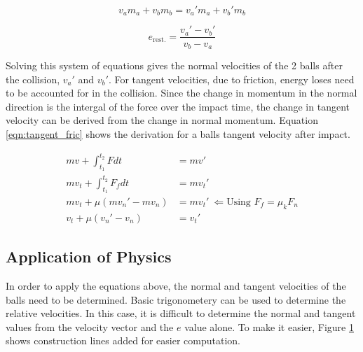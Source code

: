 \documentclass[12pt]{article}
\begin{document}
\begin{equation}
    \label{eqn:pt1_momentum}
    v_a m_a + v_b m_b = v_a' m_a + v_b' m_b
\end{equation}

\begin{equation}
    \label{eqn:pt1_restitution}
    e_{\text{rest.}} = \frac{v_a' - v_b'}{v_b - v_a}
\end{equation}

Solving this system of equations gives the normal velocities of the 2 balls after the collision, $v_a'$ and $v_b'$. For tangent velocities, due to friction, energy loses need to be accounted for in the collision. Since the change in momentum in the normal direction is the intergal of the force over the impact time, the change in tangent velocity can be derived from the change in normal momentum. Equation \ref{eqn:tangent_fric} shows the derivation for a balls tangent velocity after impact.

\begin{equation}
    \label{eqn:tangent_fric}
    \begin{aligned}
        mv + \int_{t_1}^{t_2} Fdt &= mv' \\
        mv_t + \int_{t_1}^{t_2} F_f dt &= mv_t' \\
        mv_t + \mu\left(mv_n' - mv_n\right) &= mv_t' \ \Leftarrow \text{Using $F_f = \mu_k F_n$}\\
        v_t + \mu\left(v_n' - v_n\right) &= v_t'
    \end{aligned}
\end{equation}

\subsection{Application of Physics}
In order to apply the equations above, the normal and tangent velocities of the balls need to be determined. Basic trigonometery can be used to determine the relative velocities. In this case, it is difficult to determine the normal and tangent values from the velocity vector and the $e$ value alone. To make it easier, Figure \ref{P1_diag_exp} shows construction lines added for easier computation.

\begin{figure}[H]
    \centering
    
    \label{P1_diag_exp}
\end{figure}
\end{document}
